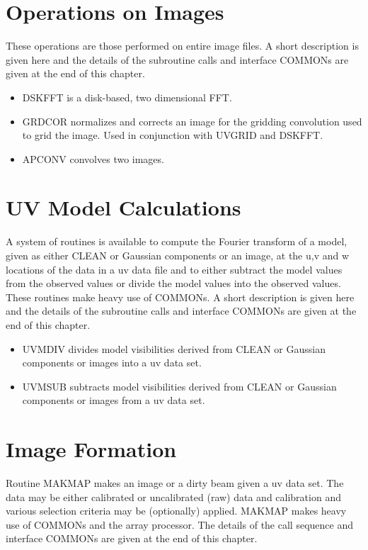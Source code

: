 \section{Operations on Images}
These operations are those performed on entire image files.  A short
description is given here and the details of the subroutine calls and
interface COMMONs are given at the end of this chapter.
\begin{itemize} %
\item DSKFFT is a disk-based, two dimensional FFT.
\item GRDCOR normalizes and corrects an image for the gridding convolution
used to grid the image.  Used in conjunction with UVGRID and DSKFFT.
\item APCONV convolves two images.

\end{itemize} %

\section{UV Model Calculations}
A system of routines is available to compute the Fourier transform of
a model, given as either CLEAN or Gaussian components or an image, at
the u,v and w locations of the data in a uv data file and to either
subtract the model values from the observed values or divide the model
values into the observed values.  These routines make heavy use of
COMMONs.  A short description is given here and the details of the
subroutine calls and interface COMMONs are given at the end of this
chapter.
\begin{itemize} %
\item UVMDIV divides model visibilities derived from CLEAN or Gaussian
components or images into a uv data set.
\item UVMSUB subtracts model visibilities derived from CLEAN or
Gaussian components or images from a uv data set.

\end{itemize} %

\section{Image Formation}
Routine MAKMAP makes an image or a dirty beam given a uv data set.
The data may be either calibrated or uncalibrated (raw) data and
calibration and various selection criteria may be (optionally)
applied.  MAKMAP makes heavy use of COMMONs and the array processor.
The details of the call sequence and interface COMMONs are given at
the end of this chapter.

